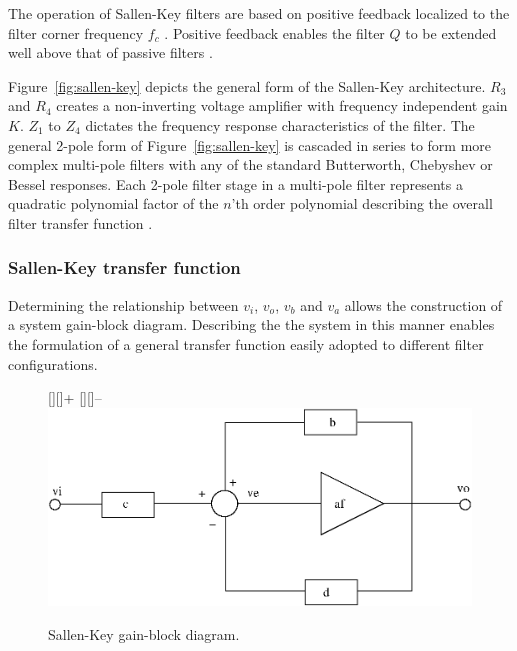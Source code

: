 The operation of Sallen-Key filters are based on positive feedback
localized to the filter corner frequency $f_c$
\cite[p1]{sk-analysis}. Positive feedback enables the filter $Q$ to
be extended well above that of passive filters \cite[p267]{art}.

Figure~\vref{fig:sallen-key} depicts the general form of the
Sallen-Key architecture. $R_3$ and $R_4$ creates a non-inverting
voltage amplifier with frequency independent gain $K$. $Z_1$ to $Z_4$
dictates the frequency response characteristics of the filter. The
general 2-pole form of Figure~\vref{fig:sallen-key} is cascaded in
series to form more complex multi-pole filters with any of the
standard Butterworth, Chebyshev or Bessel responses. Each 2-pole
filter stage in a multi-pole filter represents a quadratic polynomial
factor of the $n$'th order polynomial describing the overall filter
transfer function \cite[p274]{art}.

\subsubsection{ Sallen-Key transfer function}
Determining the relationship between $v_i$, $v_o$, $v_b$ and $v_a$
allows the construction of a system gain-block diagram. Describing the
the system in this manner enables the formulation of a general
transfer function easily adopted to different filter configurations.

\begin{figure}[htbp]
	\psfrag{+}[][]{+}
	\psfrag{-}[][]{--}
	\includegraphics{sk-block.eps}
	\caption{Sallen-Key gain-block diagram.}
	\label{fig:sk-block} 
\end{figure}

